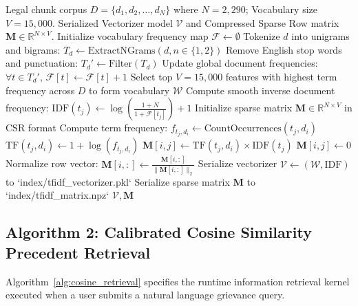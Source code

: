 \begin{algorithm}[H]
\caption{Sublinear TF-IDF Sparse Feature Matrix Construction and Serialization}
\label{alg:tfidf_construction}
\begin{algorithmic}[1]
\Require Legal chunk corpus $D = \{d_1, d_2, \dots, d_N\}$ where $N = 2,290$; Vocabulary size $V = 15,000$.
\Ensure Serialized Vectorizer model $\mathcal{V}$ and Compressed Sparse Row matrix $\mathbf{M} \in \mathbb{R}^{N \times V}$.
\State Initialize vocabulary frequency map $\mathcal{F} \leftarrow \emptyset$
    \State Tokenize $d$ into unigrams and bigrams: $T_d \leftarrow \text{ExtractNGrams}(d, n \in \{1, 2\})$
    \State Remove English stop words and punctuation: $T_d' \leftarrow \text{Filter}(T_d)$
    \State Update global document frequencies: $\forall t \in T_d', \, \mathcal{F}[t] \leftarrow \mathcal{F}[t] + 1$
\EndFor
\State Select top $V = 15,000$ features with highest term frequency across $D$ to form vocabulary $\mathcal{W}$
    \State Compute smooth inverse document frequency:
    \State $\text{IDF}(t_j) \leftarrow \log\left(\frac{1 + N}{1 + \mathcal{F}[t_j]}\right) + 1$
\EndFor
\State Initialize sparse matrix $\mathbf{M} \in \mathbb{R}^{N \times V}$ in CSR format
        \State Compute term frequency: $f_{t_j, d_i} \leftarrow \text{CountOccurrences}(t_j, d_i)$
            \State $\text{TF}(t_j, d_i) \leftarrow 1 + \log(f_{t_j, d_i})$ 
            \State $\mathbf{M}[i, j] \leftarrow \text{TF}(t_j, d_i) \times \text{IDF}(t_j)$
        \Else
            \State $\mathbf{M}[i, j] \leftarrow 0$
        \EndIf
    \EndFor
    \State Normalize row vector: $\mathbf{M}[i, :] \leftarrow \frac{\mathbf{M}[i, :]}{\|\mathbf{M}[i, :]\|_2}$ 
\EndFor
\State Serialize vectorizer $\mathcal{V} \leftarrow (\mathcal{W}, \text{IDF})$ to `index/tfidf_vectorizer.pkl`
\State Serialize sparse matrix $\mathbf{M}$ to `index/tfidf_matrix.npz`
\State \Return $\mathcal{V}, \mathbf{M}$
\end{algorithmic}
\end{algorithm}

\subsection{Algorithm 2: Calibrated Cosine Similarity Precedent Retrieval}
Algorithm~\ref{alg:cosine_retrieval} specifies the runtime information retrieval kernel executed when a user submits a natural language grievance query.

